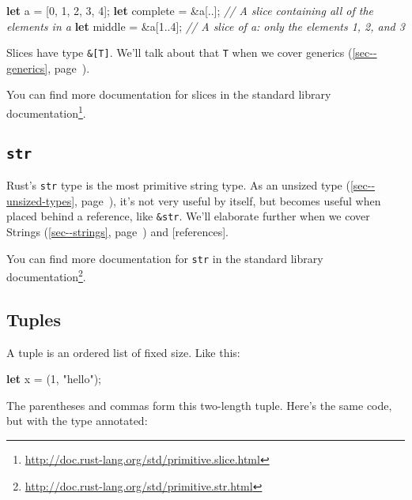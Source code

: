 \documentclass[a4paper,]{book}
\renewcommand*{\hypertarget}[3][\ar]{%
  \def\ar{#2}%
  \label{#1}%
  #3}
\renewcommand*{\hyperlink}[2]{%
 #2 (\autoref{#1}, page~\pageref{#1})}
\newenvironment{Shaded}{\begin{snugshade}}{\end{snugshade}}
\newcommand{\KeywordTok}[1]{\textcolor[rgb]{0.13,0.29,0.53}{\textbf{{#1}}}}
\newcommand{\DecValTok}[1]{\textcolor[rgb]{0.00,0.00,0.81}{{#1}}}
\newcommand{\StringTok}[1]{\textcolor[rgb]{0.31,0.60,0.02}{{#1}}}
\newcommand{\CommentTok}[1]{\textcolor[rgb]{0.56,0.35,0.01}{\textit{{#1}}}}
\newcommand{\NormalTok}[1]{{#1}}
\renewcommand{\href}[2]{#2\footnote{\url{#1}}}
\begin{document}
\begin{Shaded}
\begin{Highlighting}[]
\KeywordTok{let} \NormalTok{a = [}\DecValTok{0}\NormalTok{, }\DecValTok{1}\NormalTok{, }\DecValTok{2}\NormalTok{, }\DecValTok{3}\NormalTok{, }\DecValTok{4}\NormalTok{];}
\KeywordTok{let} \NormalTok{complete = &a[..]; }\CommentTok{// A slice containing all of the elements in a}
\KeywordTok{let} \NormalTok{middle = &a[}\DecValTok{1.}\NormalTok{.}\DecValTok{4}\NormalTok{]; }\CommentTok{// A slice of a: only the elements 1, 2, and 3}
\end{Highlighting}
\end{Shaded}

Slices have type \texttt{\&{[}T{]}}. We'll talk about that \texttt{T}
when we cover \protect\hyperlink{sec--generics}{generics}.

You can find more documentation for slices
\href{http://doc.rust-lang.org/std/primitive.slice.html}{in the standard
library documentation}.

\subsection{\texorpdfstring{\texttt{str}}{str}}\label{str}

Rust's \texttt{str} type is the most primitive string type. As an
\protect\hyperlink{sec--unsized-types}{unsized type}, it's not very
useful by itself, but becomes useful when placed behind a reference,
like \texttt{\&str}. We'll elaborate further when we cover
\protect\hyperlink{sec--strings}{Strings} and {[}references{]}.

You can find more documentation for \texttt{str}
\href{http://doc.rust-lang.org/std/primitive.str.html}{in the standard
library documentation}.

\hypertarget{tuples}{\subsection{Tuples}\label{tuples}}

A tuple is an ordered list of fixed size. Like this:

\begin{Shaded}
\begin{Highlighting}[]
\KeywordTok{let} \NormalTok{x = (}\DecValTok{1}\NormalTok{, }\StringTok{"hello"}\NormalTok{);}
\end{Highlighting}
\end{Shaded}

The parentheses and commas form this two-length tuple. Here's the same
code, but with the type annotated:
\end{document}
